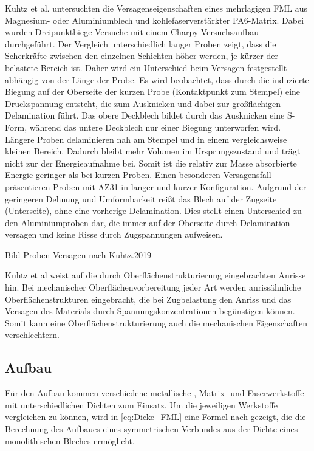 Kuhtz et al. \cite{Kuhtz.2019} untersuchten die Versagenseigenschaften eines mehrlagigen FML aus Magnesium- oder Aluminiumblech und kohlefaserverstärkter PA6-Matrix.
Dabei wurden Dreipunktbiege Versuche mit einem Charpy Versuchsaufbau durchgeführt.
Der Vergleich unterschiedlich langer Proben zeigt, dass die Scherkräfte zwischen den einzelnen Schichten höher werden, je kürzer der belastete Bereich ist.
Daher wird ein Unterschied beim Versagen festgestellt abhängig von der Länge der Probe.
Es wird beobachtet, dass durch die induzierte Biegung auf der Oberseite der kurzen Probe (Kontaktpunkt zum Stempel) eine Druckspannung entsteht, die zum Ausknicken und dabei zur großflächigen Delamination führt.
Das obere Deckblech bildet durch das Ausknicken eine S-Form, während das untere Deckblech nur einer Biegung unterworfen wird.
Längere Proben delaminieren nah am Stempel und in einem vergleichsweise kleinen Bereich.
Dadurch bleibt mehr Volumen im Ursprungszustand und trägt nicht zur der Energieaufnahme bei.
Somit ist die relativ zur Masse absorbierte Energie geringer als bei kurzen Proben.
Einen besonderen Versagensfall präsentieren Proben mit AZ31 in langer und kurzer Konfiguration.
Aufgrund der geringeren Dehnung und Umformbarkeit reißt das Blech auf der Zugseite (Unterseite), ohne eine vorherige Delamination.
Dies stellt einen Unterschied zu den Aluminiumproben dar, die immer auf der Oberseite durch Delamination versagen und keine Risse durch Zugspannungen aufweisen.

Bild Proben Versagen nach Kuhtz.2019

Kuhtz et al \cite{Kuhtz.2019} weist auf die durch Oberflächenstrukturierung eingebrachten Anrisse hin.
Bei mechanischer Oberflächenvorbereitung jeder Art werden anrissähnliche Oberflächenstrukturen eingebracht, die bei Zugbelastung den Anriss und das Versagen des Materials durch Spannungskonzentrationen begünstigen können.
Somit kann eine Oberflächenstrukturierung auch die mechanischen Eigenschaften verschlechtern.

\subsection{Aufbau}\label{sec:Aufbau}


Für den Aufbau kommen verschiedene metallische-, Matrix- und Faserwerkstoffe mit unterschiedlichen Dichten zum Einsatz.
Um die jeweiligen Werkstoffe vergleichen zu können, wird in \autoref{eq:Dicke_FML} eine Formel nach \cite{Wollmann.2018} gezeigt, die die Berechnung des Aufbaues eines symmetrischen Verbundes aus der Dichte eines monolithischen Bleches ermöglicht.

